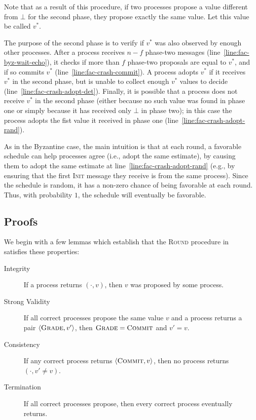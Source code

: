 Note that as a result of this procedure, if two processes propose a value different from $\bot$ for the second phase, they propose exactly the same value.
Let this value be called $v^*$.

The purpose of the second phase is to verify if $v^*$ was also observed by enough other processes.
After a process receives $n-f$ phase-two messages (line~\ref{line:fac-byz-wait-echo}), it checks if more than $f$ phase-two proposals are equal to $v^*$, and if so commits $v^*$ (line~\ref{line:fac-crash-commit}). A process adopts $v^*$ if it receives $v^*$ in the second phase, but is unable to collect enough $v^*$ values to decide (line~\ref{line:fac-crash-adopt-det}). Finally, it is possible that a process does not receive $v^*$ in the second phase (either because no such value was found in phase one or simply because it has received only $\bot$ in phase two); in this case the process adopts the fist value it received in phase one (line~\ref{line:fac-crash-adopt-rand}). 

As in the Byzantine case, the main intuition is that at each round, a favorable schedule can help processes agree (i.e., adopt the same estimate), by causing them to adopt the same estimate at line~\ref{line:fac-crash-adopt-rand} (e.g., by ensuring that the first \textsc{Init} message they receive is from the same process). Since the schedule is random, it has a non-zero chance of being favorable at each round. Thus, with probability $1$, the schedule will eventually be favorable. 

\subsection{Proofs}
We begin with a few lemmas which establish that the \textsc{Round} procedure in  satisfies these properties:
\begin{description}
    \item[Integrity] If a process returns $(\cdot, v)$, then $v$ was proposed by some process.
    \item[Strong Validity] If all correct processes propose the same value $v$ and a process returns a pair $\langle \textsc{Grade}, v' \rangle$, then $\textsc{Grade} = \textsc{Commit}$ and $v' = v$.
    \item[Consistency] If any correct process returns  $\langle \textsc{Commit}, v \rangle$, then no process returns $(\cdot, v' \ne v)$.
    \item[Termination] If all correct processes propose, then every correct process eventually returns.
\end{description}

